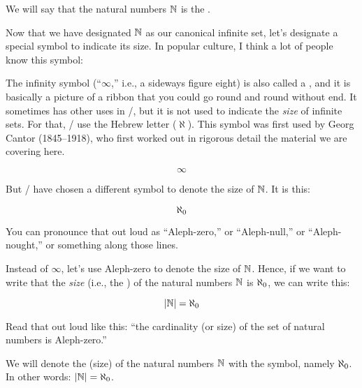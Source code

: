 \documentclass[../../../main.tex]{subfiles}
\begin{document}
\begin{fdefinition}
  \label{def:canonical-infinite-set}
  We will say that the natural numbers $\Nats/$ is the . 
\end{fdefinition}

Now that we have designated $\Nats/$ as our canonical infinite set, let's designate a special symbol to indicate its size. In popular culture, I think a lot of people know this symbol:

\begin{aside}
  \begin{remark}
    The infinity symbol (``$\infty$,'' i.e., a sideways figure eight) is also called a , and it is basically a picture of a ribbon that you could go round and round without end. It sometimes has other uses in \math/, but it is not used to indicate the \emph{size} of infinite sets. For that, \mathers/ use the Hebrew letter  ($\aleph$). This symbol was first used by Georg Cantor (1845--1918), who first worked out in rigorous detail the material we are covering here.
  \end{remark}
\end{aside}

\begin{equation*}
  \infty
\end{equation*}

But \mathers/ have chosen a different symbol to denote the size of $\Nats/$. It is this:

\begin{equation*}
  \AlephZero/
\end{equation*}

You can pronounce that out loud as ``Aleph-zero,'' or ``Aleph-null,'' or ``Aleph-nought,'' or something along those lines. 

Instead of $\infty$, let's use Aleph-zero to denote the size of $\Nats/$. Hence, if we want to write that the \emph{size} (i.e., the ) of the natural numbers $\Nats/$ is $\AlephZero/$, we can write this:

\begin{equation*}
  \cardinality{\Nats/} = \AlephZero/
\end{equation*}

Read that out loud like this: ``the cardinality (or size) of the set of natural numbers is Aleph-zero.''

\begin{fdefinition}
  \label{def:aleph-zero}
  We will denote the  (size) of the natural numbers $\Nats/$ with the  symbol, namely $\AlephZero/$. In other words: $\cardinality{\Nats/} = \AlephZero/$.
\end{fdefinition}
\end{document}

